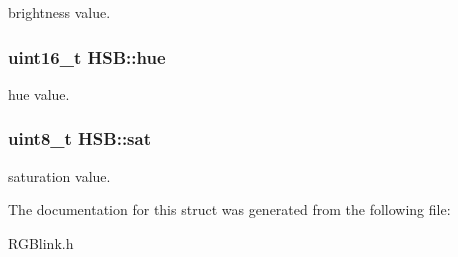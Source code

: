 brightness value. 

\hypertarget{struct_h_s_b_a97e44b31b1532aa71becd8be2b371312}{
\subsubsection[{hue}]{\setlength{\rightskip}{0pt plus 5cm}uint16\-\_\-t H\-S\-B\-::hue}}\label{struct_h_s_b_a97e44b31b1532aa71becd8be2b371312}


hue value. 

\hypertarget{struct_h_s_b_aa0f19da1a643bb8bbb52d23513c314c4}{
\subsubsection[{sat}]{\setlength{\rightskip}{0pt plus 5cm}uint8\-\_\-t H\-S\-B\-::sat}}\label{struct_h_s_b_aa0f19da1a643bb8bbb52d23513c314c4}


saturation value. 



The documentation for this struct was generated from the following file\-:\begin{DoxyCompactItemize}
\item 
R\-G\-Blink.\-h\end{DoxyCompactItemize}
